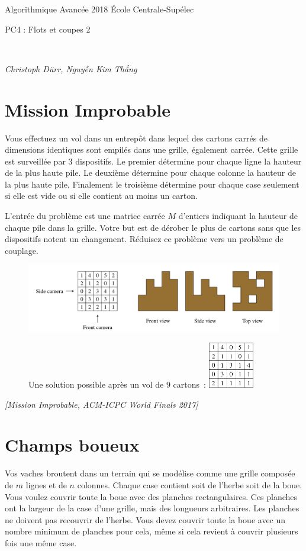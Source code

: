\documentclass[12pt]{article}
\newcommand{\source}[1]{\begin{flushright}\emph{[#1]}\end{flushright}}
\newcommand{\MakeScribeTop}[1]{
\noindent
\begin{framed}
\noindent
 Algorithmique Avancée 2018
 \hfill
 École Centrale-Supélec
 \\[1em]
 \centerline{ \Large
#1
 }
 \\[1em]
\centerline{  \it Christoph Dürr, Nguyễn Kim Thắng}
\end{framed}
}
\begin{document}
    \MakeScribeTop{PC4 : Flots et coupes 2}

\section{Mission Improbable}

Vous effectuez un vol dans un entrepôt dans lequel des cartons carrés de dimensions identiques sont empilés dans une grille, également carrée.  
Cette grille est surveillée par 3 dispositifs. Le premier détermine pour chaque ligne la hauteur de la plus haute pile.
Le deuxième détermine pour chaque colonne la hauteur de la plus haute pile.
Finalement le troisième détermine pour chaque case seulement si elle est vide ou si elle contient au moins un carton.

L'entrée du problème est une matrice carrée $M$ d'entiers indiquant la hauteur de chaque pile dans la grille.
Votre but est de dérober le plus de cartons sans que les dispositifs notent un changement.  Réduisez ce problème vers un problème de couplage.

\begin{figure}[h]
	\centerline{\includegraphics{mission_impossible_in.png}}
	\centerline{Une solution possible après un vol de 9 cartons~: \includegraphics[width=2cm]{mission_impossible_out.png}}
\end{figure}

\source{Mission Improbable, ACM-ICPC World Finals 2017}

\section{Champs boueux}

Vos vaches broutent dans un terrain qui se modélise comme une grille composée de $m$ lignes et de $n$ colonnes. Chaque case contient soit de l'herbe soit de la boue. Vous voulez couvrir toute la boue avec des planches rectangulaires. Ces planches ont la largeur de la case d'une grille, mais des longueurs arbitraires. Les planches ne doivent pas recouvrir de l'herbe.  Vous devez couvrir toute la boue avec un nombre minimum de planches pour cela, même si cela revient à couvrir plusieurs fois une même case. 
\end{document}
